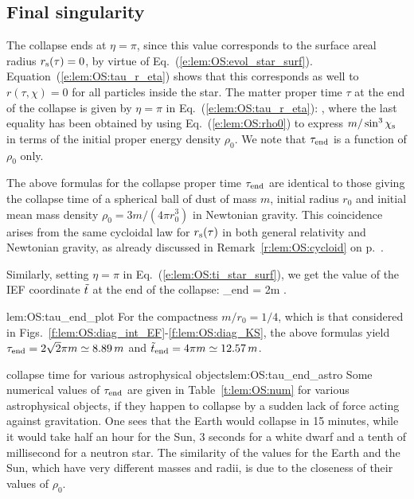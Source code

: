 \subsection{Final singularity}

The collapse ends at $\eta = \pi$, since this value corresponds to the surface
areal radius $r_{\rm s}(\tau) = 0$, by virtue of Eq.~(\ref{e:lem:OS:evol_star_surf}).
Equation~(\ref{e:lem:OS:tau_r_eta}) shows that this corresponds as well
to $r(\tau,\chi) = 0$ for all
particles inside the star. The matter proper time $\tau$ at the end of the collapse
is given by $\eta=\pi$ in Eq.~(\ref{e:lem:OS:tau_r_eta}):
\be \label{e:lem:OS:tau_end}
   ,
\ee
where the last equality has been obtained by using Eq.~(\ref{e:lem:OS:rho0})
to express $m/\sin^3\chi_{\rm s}$ in terms of the initial proper energy density $\rho_0$.
We note that $\tau_{\rm end}$ is a function of $\rho_0$ only.

\begin{remark}
The above formulas for the collapse proper time $\tau_{\rm end}$ are identical
to those giving the collapse time of a spherical ball of dust of mass $m$, initial radius
$r_0$ and initial mean mass density $\rho_0=3 m/(4\pi r_0^3)$ in Newtonian gravity.
This coincidence arises from the
same cycloidal law for $r_{\rm s}(\tau)$ in both general relativity and Newtonian gravity,
as already discussed in Remark~\ref{r:lem:OS:cycloid} on p.~\pageref{r:lem:OS:cycloid}.
\end{remark}

Similarly, setting $\eta=\pi$ in Eq.~(\ref{e:lem:OS:ti_star_surf}), we get the value
of the IEF coordinate ${\tilde t}$ at the end of the collapse:
\be
     \ti_{\rm end} = 2m  .
\ee
\begin{texample}{}{lem:OS:tau_end_plot}
For the compactness $m/r_0 = 1/4$, which is that considered in Figs.~\ref{f:lem:OS:diag_int_EF}-\ref{f:lem:OS:diag_KS}, the above formulas yield
$\tau_{\rm end} = 2 \sqrt{2} \pi m \simeq 8.89\, m$ and
${\tilde t}_{\rm end} = 4 \pi m \simeq 12.57\, m$.
\end{texample}

\begin{texample}{collapse time for various astrophysical objects}{lem:OS:tau_end_astro}
Some numerical values of $\tau_{\rm end}$ are given in Table~\ref{t:lem:OS:num} for
various astrophysical objects, if they happen to collapse by a sudden lack
of force acting against gravitation. One sees that the Earth
would collapse in 15 minutes, while it would take half an hour for the Sun,
3 seconds for a white dwarf and a tenth of millisecond for a neutron star.
The similarity of the values for the Earth and the Sun, which have very different
masses and radii, is due to the closeness of their values of $\rho_0$.
\end{texample}

